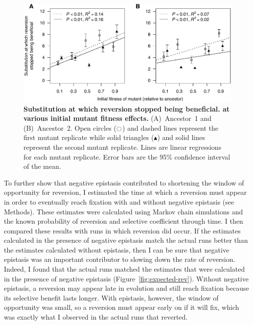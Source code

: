 \begin{doublespace}
\begin{figure}[b!]
\begin{center}
\includegraphics[width=\linewidth]{first-mut-rev-bad-W.pdf}
\end{center}
\caption{{\bf Substitution at which reversion stopped being beneficial.
  at various initial mutant fitness effects.}
  (A)~Ancestor~1 and (B)~Ancestor~2.
  Open circles ($\ocircle$) and dashed lines
  represent the first mutant replicate
  while solid triangles ($\blacktriangle$) and solid lines
  represent the second mutant replicate.
  Lines are linear regressions for each mutant replicate.
  Error bars are the 95\% confidence interval of the mean.}
\label{fig:first-mut-rev-bad-W}
\end{figure}



To further show that negative epistasis contributed
to shortening the window of opportunity for reversion,
I estimated the time at which a reversion must appear
in order to eventually reach fixation
with and without negative epistasis (see Methods).
%
These estimates were calculated using Markov chain simulations
and the known probability of reversion and selective coefficient through time.
%
I then compared these results with runs in which reversion did occur.
%
If the estimates calculated in the presence of negative epistasis
match the actual runs better than the estimates calculated without epistasis,
then I can be sure that negative epistasis
was an important contributor to slowing down the rate of reversion.
%
Indeed, I found that the actual runs matched the estimates
that were calculated in the presence of negative epistasis
(Figure~\ref{fig:expected-rev}).
%
Without negative epistasis, a reversion may appear late in evolution
and still reach fixation because its selective benefit lasts longer.
%
With epistasis, however, the window of opportunity was small,
so a reversion must appear early on if it will fix,
which was exactly what I observed in the actual runs that reverted.




\end{doublespace}
